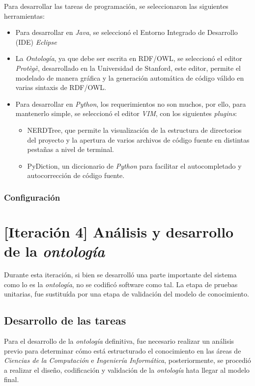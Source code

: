Para desarrollar las tareas de programación, se seleccionaron las siguientes herramientas:
\begin{itemize}
    \item Para desarrollar en \textit{Java}, se seleccionó el Entorno Integrado de Desarrollo (IDE) \textit{Eclipse}
    \item La \textit{Ontología}, ya que debe ser escrita en RDF/OWL, se seleccionó el editor \textit{Protègè}, desarrollado en la Universidad de Stanford, este editor, permite el modelado de manera gráfica y la generación automática de código válido en varias sintaxis de RDF/OWL.
    \item Para desarrollar en \textit{Python}, los requerimientos no son muchos, por ello, para mantenerlo simple, se seleccionó el editor \textit{VIM}, con los siguientes \textit{plugins}:
    \begin{itemize}
        \item NERDTree, que permite la visualización de la estructura de directorios del proyecto y la apertura de varios archivos de código fuente en distintas pestañas a nivel de terminal.
        \item PyDiction, un diccionario de \textit{Python} para facilitar el autocompletado y autocorrección de código fuente.
    \end{itemize}
\end{itemize}

\subsubsection{Configuración}

\section{[Iteración 4] Análisis y desarrollo de la \textit{ontología}}
Durante esta iteración, si bien se desarrolló una parte importante del sistema como lo es la \textit{ontología}, no se codificó software como tal. La etapa de pruebas unitarias, fue sustituída por una etapa de validación del modelo de conocimiento.

\subsection{Desarrollo de las tareas}
Para el desarrollo de la \textit{ontología} definitiva, fue necesario realizar un análisis previo para determinar cómo está estructurado el conocimiento en las áreas de \textit{Ciencias de la Computación} e \textit{Ingeniería Informática}, posteriormente, se procedió a realizar el diseño, codificación y validación de la \textit{ontología} hata llegar al modelo final.

